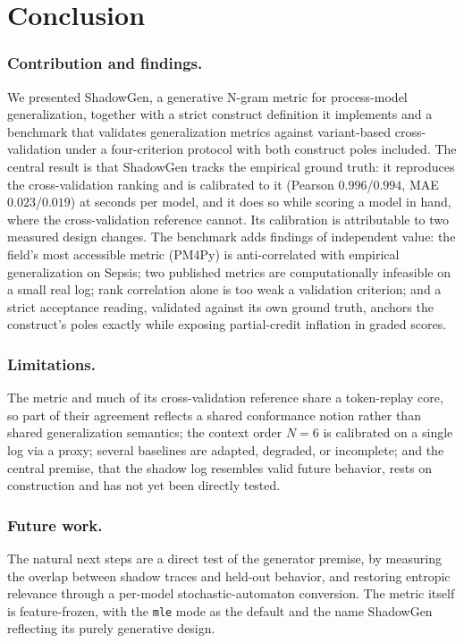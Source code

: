\documentclass[runningheads]{llncs}
\begin{document}
\section{Conclusion}
\label{sec:conclusion}

\subsubsection{Contribution and findings.}
We presented ShadowGen, a generative N-gram metric for process-model generalization, together with a strict construct definition it implements and a benchmark that validates generalization metrics against variant-based cross-validation under a four-criterion protocol with both construct poles included. The central result is that ShadowGen tracks the empirical ground truth: it reproduces the cross-validation ranking and is calibrated to it (Pearson $0.996$/$0.994$, MAE $0.023$/$0.019$) at seconds per model, and it does so while scoring a model in hand, where the cross-validation reference cannot. Its calibration is attributable to two measured design changes. The benchmark adds findings of independent value: the field's most accessible metric (PM4Py) is anti-correlated with empirical generalization on Sepsis; two published metrics are computationally infeasible on a small real log; rank correlation alone is too weak a validation criterion; and a strict acceptance reading, validated against its own ground truth, anchors the construct's poles exactly while exposing partial-credit inflation in graded scores.

\subsubsection{Limitations.}
The metric and much of its cross-validation reference share a token-replay core, so part of their agreement reflects a shared conformance notion rather than shared generalization semantics; the context order $N{=}6$ is calibrated on a single log via a proxy; several baselines are adapted, degraded, or incomplete; and the central premise, that the shadow log resembles valid future behavior, rests on construction and has not yet been directly tested.

\subsubsection{Future work.}
The natural next steps are a direct test of the generator premise, by measuring the overlap between shadow traces and held-out behavior, and restoring entropic relevance through a per-model stochastic-automaton conversion. The metric itself is feature-frozen, with the \texttt{mle} mode as the default and the name ShadowGen reflecting its purely generative design.
\end{document}
